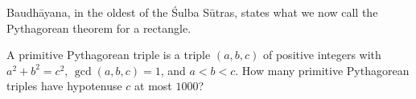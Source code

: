 Baudhāyana, in the oldest of the Śulba Sūtras, states what we now call the Pythagorean theorem for a rectangle.

A primitive Pythagorean triple is a triple \((a,b,c)\) of positive integers with \(a^2+b^2=c^2\), \(\gcd(a,b,c)=1\), and \(a<b<c\). How many primitive Pythagorean triples have hypotenuse \(c\) at most \(1000\)?
